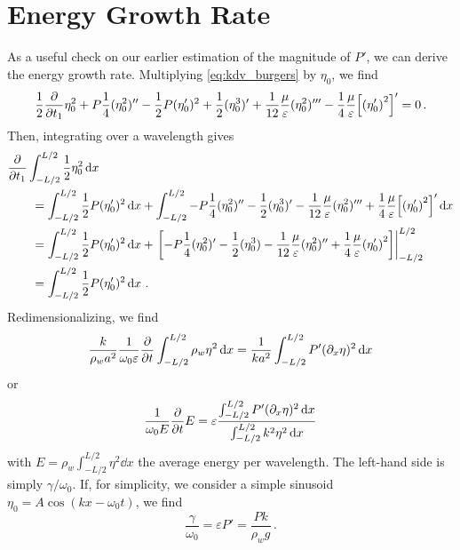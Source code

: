 \documentclass{jfm}
\renewcommand*{\epsilon}{\varepsilon}
\begin{document}
\appendix

\section{Energy Growth Rate \label{sec:energy_growth_rate}}
As a useful check on our earlier estimation of the magnitude of $P'$, we
can derive the energy growth rate.
Multiplying \cref{eq:kdv_burgers} by $\eta_0$, we find
\begin{equation}
  \frac{1}{2} \pdv{t_1} \eta_0^2 + P
  \frac{1}{4} (\eta_0^2)'' - \frac{1}{2} P
  (\eta_0')^2 + \frac{1}{2} (\eta_0^3)' + \frac{1}{12}
  \frac{\mu}{\epsilon} (\eta_0^2)''' - \frac{1}{4} \frac{\mu}{\epsilon}
  \bqty{\pqty{\eta_0'}^2}' = 0 \,.
\end{equation}
Then, integrating over a wavelength gives
\begin{equation}
  \begin{split}
  &\pdv{t_1} \int_{-L/2}^{L/2} \frac{1}{2} \eta_0^2 \dd{x} \\
  &\qquad= \int_{-L/2}^{L/2} \frac{1}{2} P
    (\eta_0')^2 \dd{x} + \int_{-L/2}^{L/2} -P
    \frac{1}{4} (\eta_0^2)'' - \frac{1}{2}
    (\eta_0^3)' - \frac{1}{12} \frac{\mu}{\epsilon} (\eta_0^2)''' +
    \frac{1}{4} \frac{\mu}{\epsilon} \bqty{\pqty{\eta_0'}^2}' \dd{x}
  \\
  &\qquad=
  \int_{-L/2}^{L/2} \frac{1}{2} P
  (\eta_0')^2 \dd{x} + \eval{\bqty{-P
      \frac{1}{4} (\eta_0^2)'  - \frac{1}{2} (\eta_0^3) - \frac{1}{12}
      \frac{\mu}{\epsilon} (\eta_0^2)'' + \frac{1}{4}
      \frac{\mu}{\epsilon} \pqty{\eta_0'}^2}}_{-L/2}^{L/2}
  \\
  &\qquad=
  \int_{-L/2}^{L/2} \frac{1}{2} P (\eta_0')^2 \dd{x} \,.
  \end{split}
\end{equation}
Redimensionalizing, we find
\begin{equation}
  \frac{k}{\rho_w a^2} \frac{1}{\omega_0 \epsilon} \pdv{t} \int_{-L/2}^{L/2}
  \rho_w \eta^2 \dd{x} = \frac{1}{k a^2} \int_{-L/2}^{L/2} P'
  (\partial_x \eta)^2 \dd{x}
\end{equation}
or
\begin{equation}
  \frac{1}{\omega_0 E} \pdv{t} E =
  \epsilon
  \frac{
    \int_{-L/2}^{L/2} P' (\partial_x \eta)^2 \dd{x}
  }
  {
    \int_{-L/2}^{L/2} k^2 \eta^2 \dd{x}
  }
\end{equation}
with $E = \rho_w \int_{-L/2}^{L/2} \eta^2 \dd{x}$ the average
energy per wavelength.
The left-hand side is simply $\gamma/\omega_0$.
If, for simplicity, we consider a simple sinusoid $\eta_0 = A \cos(k x -
\omega_0 t)$, we find
\begin{equation}
  \frac{\gamma}{\omega_0} = \epsilon P' = \frac{P k}{\rho_w g} \,.
\end{equation}



\end{document}

